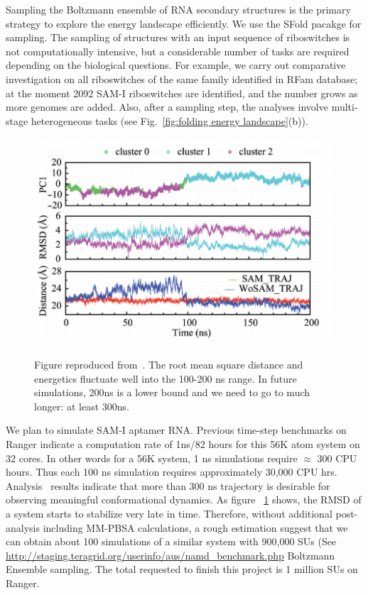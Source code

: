 \documentclass[a4paper,10pt]{article}
\newcommand{\up}{\vspace*{-1em}}
\begin{document}
Sampling the Boltzmann ensemble of RNA secondary structures is the primary strategy to explore the energy landscape efficiently.  We use the SFold pacakge\cite{ding2006} for sampling. The sampling of structures with an input sequence of riboswitches is not computationally intensive, but a considerable number of tasks are required depending on the biological questions.  For example, we carry out comparative investigation on all riboswitches of the same family identified in RFam database; at the moment 2092 SAM-I riboswitches are identified, and the number grows as more genomes are added.  Also, after a sampling step, the analyses involve multi-stage heterogeneous tasks (see Fig.~\ref{fig:folding energy landscape}(b)).  


\begin{figure}%
\begin{center}
  \includegraphics[scale=0.4]{Figure3}
   \caption{ Figure reproduced from~\cite{SAM-I-NAR2009}. The root mean square distance and energetics fluctuate well into the 100-200 ns range. In future simulations, 200ns is a lower bound and we need to go to much longer: at least 300ns.
}
\up\up
\label{fig:Fig3}
\end{center}
\end{figure}


We plan to simulate SAM-I aptamer RNA. Previous time-step benchmarks on Ranger indicate a computation rate of 1ns/82 hours for this 56K atom system on 32 cores. In other words for a 56K system, 1 ns simulations require $\approx$ 300 CPU hours.  Thus each 100 ns simulation requires approximately 30,000 CPU hrs.  Analysis~\cite{SAM-I-NAR2009} results indicate that more than 300 ns trajectory is desirable for observing meaningful conformational dynamics. As figure ~\ref{fig:Fig3} shows, the RMSD of a system starts to stabilize very late in time. Therefore, without additional post-analysis including MM-PBSA calculations, a rough estimation suggest that we can obtain about 100 simulations of a similar system with 900,000 SUs (See {\url{http://staging.teragrid.org/userinfo/aus/namd_benchmark.php}} Boltzmann Ensemble sampling. The total requested to finish this project is 1 million SUs on Ranger.
\end{document}
